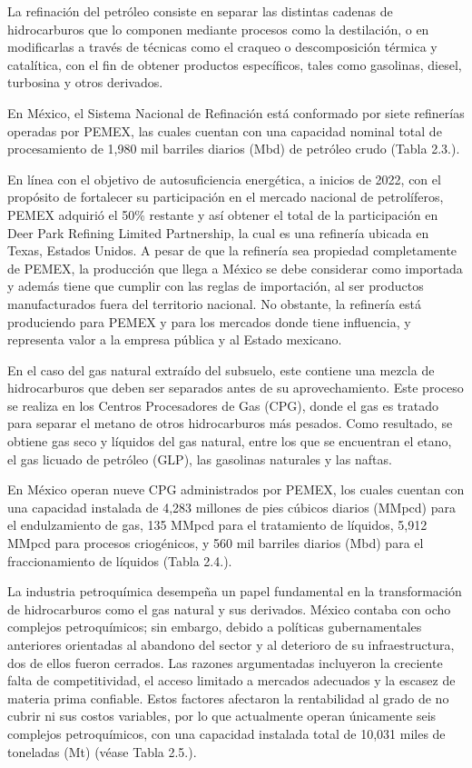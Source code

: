 \documentclass{sener2025}
\begin{document}
La refinación del petróleo consiste en separar las distintas cadenas de hidrocarburos que lo componen mediante procesos como la destilación, o en modificarlas a través de técnicas como el craqueo o descomposición térmica y catalítica, con el fin de obtener productos específicos, tales como gasolinas, diesel, turbosina y otros derivados.

En México, el Sistema Nacional de Refinación está conformado por siete refinerías operadas por PEMEX, las cuales cuentan con una capacidad nominal total de procesamiento de 1,980 mil barriles diarios (Mbd) de petróleo crudo (Tabla 2.3.).

En línea con el objetivo de autosuficiencia energética, a inicios de 2022, con el propósito de fortalecer su participación en el mercado nacional de petrolíferos, PEMEX adquirió el 50\% restante y así obtener el total de la participación en Deer Park Refining Limited Partnership, la cual es una refinería ubicada en Texas, Estados Unidos. A pesar de que la refinería sea propiedad completamente de PEMEX, la producción que llega a México se debe considerar como importada y además tiene que cumplir con las reglas de importación, al ser productos manufacturados fuera del territorio nacional. No obstante, la refinería está produciendo para PEMEX y para los mercados donde tiene influencia, y representa valor a la empresa pública y al Estado mexicano.

En el caso del gas natural extraído del subsuelo, este contiene una mezcla de hidrocarburos que deben ser separados antes de su aprovechamiento. Este proceso se realiza en los Centros Procesadores de Gas (CPG), donde el gas es tratado para separar el metano de otros hidrocarburos más pesados. Como resultado, se obtiene gas seco y líquidos del gas natural, entre los que se encuentran el etano, el gas licuado de petróleo (GLP), las gasolinas naturales y las naftas.

En México operan nueve CPG administrados por PEMEX, los cuales cuentan con una capacidad instalada de 4,283 millones de pies cúbicos diarios (MMpcd) para el endulzamiento de gas, 135 MMpcd para el tratamiento de líquidos, 5,912 MMpcd para procesos criogénicos, y 560 mil barriles diarios (Mbd) para el fraccionamiento de líquidos (Tabla 2.4.).

La industria petroquímica desempeña un papel fundamental en la transformación de hidrocarburos como el gas natural y sus derivados. México contaba con ocho complejos petroquímicos; sin embargo, debido a políticas gubernamentales anteriores orientadas al abandono del sector y al deterioro de su infraestructura, dos de ellos fueron cerrados. Las razones argumentadas incluyeron la creciente falta de competitividad, el acceso limitado a mercados adecuados y la escasez de materia prima confiable. Estos factores afectaron la rentabilidad al grado de no cubrir ni sus costos variables, por lo que actualmente operan únicamente seis complejos petroquímicos, con una capacidad instalada total de 10,031 miles de toneladas (Mt) (véase Tabla 2.5.).
\end{document}

